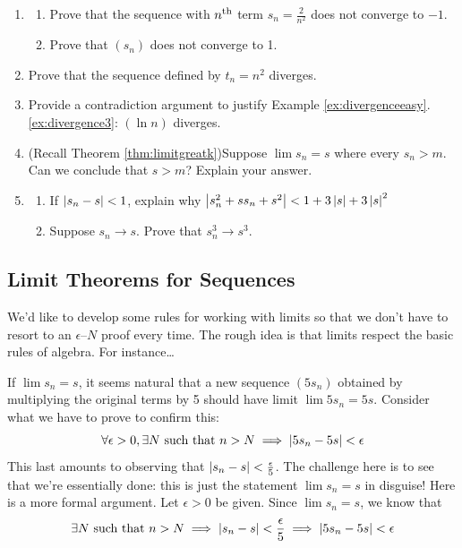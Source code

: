 \begin{exercises}{}{}
\begin{enumerate}
	 	
	  \item\begin{enumerate}
	   	\item Prove that the sequence with $n\textsuperscript{th}$ term $s_n=\frac 2{n^2}$ does not converge to $-1$.
			\item Prove that $(s_n)$ does not converge to 1.
		\end{enumerate}
	    
	  \item Prove that the sequence defined by $t_n=n^2$ diverges.
	  
	 	
	 	\item Provide a contradiction argument to justify Example \ref*{ex:divergenceeasy}.\ref{ex:divergence3}: $(\ln n)$ diverges.
	
			
		\item (Recall Theorem \ref{thm:limitgreatk})\quad Suppose $\lim s_n=s$ where every $s_n>m$. Can we conclude that $s>m$? Explain your answer.
		
		
		\item\begin{enumerate}
			\item If $\left| s_n-s\right|<1$, explain why $\left| s_n^2+ss_n+s^2\right|< 1+3\left| s\right|+3\left| s\right|^2$
			\item Suppose $s_n\to s$. Prove that $s_n^3\to s^3$.  
		\end{enumerate}
		
	\end{enumerate}
\end{exercises}

\clearpage


\iffalse


\subsection{Limit Theorems for Sequences}

We'd like to develop some rules for working with limits so that we don't have to resort to an $\epsilon$--$N$ proof every time. The rough idea is that limits respect the basic rules of algebra. For instance\ldots

\begin{example}{}{}
If $\lim s_n=s$, it seems natural that a new sequence $(5s_n)$ obtained by multiplying the original terms by 5 should have limit $\lim 5s_n=5s$. Consider what we have to prove to confirm this:
\[\forall\epsilon>0, \exists N\text{ such that }n>N\implies \left| 5s_n-5s\right|<\epsilon\]
This last amounts to observing that $\left| s_n-s\right|<\frac\epsilon 5$. The challenge here is to see that we're essentially done: this is just the statement $\lim s_n=s$ in disguise! Here is a more formal argument.\smallbreak
Let $\epsilon>0$ be given. Since $\lim s_n=s$, we know that
\[\exists N\text{ such that }n>N\implies \left| s_n-s\right|<\frac\epsilon 5\implies \left| 5s_n-5s\right|<\epsilon\]
\end{example}

